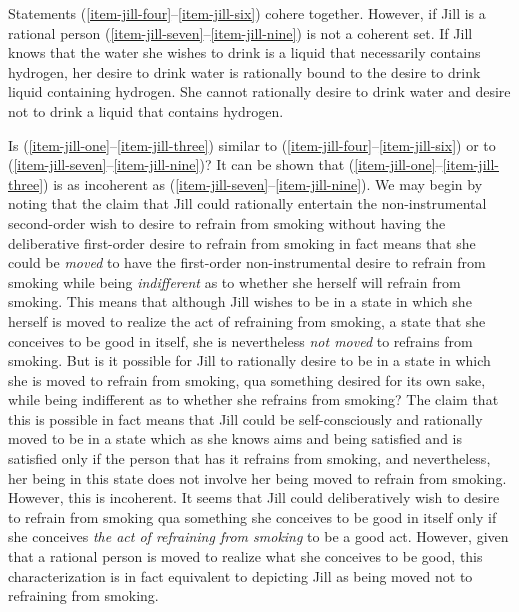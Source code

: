 \documentclass[output=paper,colorlinks,citecolor=brown
]{langscibook}
\begin{document}
Statements (\ref{item-jill-four}--\ref{item-jill-six}) cohere together. However, if Jill is a rational person (\ref{item-jill-seven}--\ref{item-jill-nine}) is not a coherent set. If Jill knows that the water she wishes to drink is a liquid that necessarily contains hydrogen, her desire to drink water is rationally bound to the desire to drink liquid containing hydrogen. She cannot rationally desire to drink water and desire not to drink a liquid that contains hydrogen. 

Is (\ref{item-jill-one}--\ref{item-jill-three}) similar to (\ref{item-jill-four}--\ref{item-jill-six}) or to (\ref{item-jill-seven}--\ref{item-jill-nine})? It can be shown that (\ref{item-jill-one}--\ref{item-jill-three}) is as incoherent as (\ref{item-jill-seven}--\ref{item-jill-nine}).
We may begin by noting that the claim that Jill could rationally entertain the non-instrumental second-order wish to desire to refrain from smoking without having the deliberative first-order desire to refrain from smoking in fact means that she could be \textit{moved} to have the first-order non-instrumental desire to refrain from smoking while being \textit{indifferent} as to whether she herself will refrain from smoking. This means that although Jill wishes to be in a state in which she herself is moved to realize the act of refraining from smoking, a state that she conceives to be good in itself, she is nevertheless \textit{not moved} to refrains from smoking. But is it possible for Jill to rationally desire to be in a state in which she is moved to refrain from smoking, qua something desired for its own sake, while being indifferent as to whether she refrains from smoking? The claim that this is possible in fact means that Jill could be self-consciously and rationally moved to be in a state which as she knows aims and being satisfied and is satisfied only if the person that has it refrains from smoking, and nevertheless, her being in this state does not involve her being moved to refrain from smoking. However, this is incoherent. It seems that Jill could deliberatively wish to desire to refrain from smoking qua something she conceives to be good in itself only if she conceives \textit{the act of refraining from smoking} to be a good act. However, given that a rational person is moved to realize what she conceives to be good, this characterization is in fact equivalent to depicting Jill as being moved not to refraining from smoking.
\end{document}
